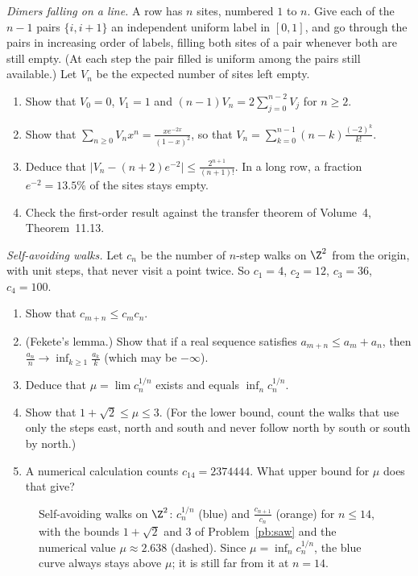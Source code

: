 \begin{exercise}[$\star\star$]\label{pb:flory}
\emph{Dimers falling on a line.} A row has $n$ sites, numbered $1$ to $n$. Give each of the $n-1$ pairs $\{i,i+1\}$ an independent uniform label in $[0,1]$, and go
through the pairs in increasing order of labels, filling both sites of a pair whenever both are still empty. (At each step the pair filled is
uniform among the pairs still available.) Let $V_n$ be the expected number of sites left empty.
\begin{enumerate}[label=(\alph*)]
\item Show that $V_0=0$, $V_1=1$ and $(n-1)V_n=2\sum_{j=0}^{n-2}V_j$ for $n\ge2$.
\item Show that $\sum_{n\ge0}V_nx^n=\frac{xe^{-2x}}{(1-x)^2}$, so that $V_n=\sum_{k=0}^{n-1}(n-k)\frac{(-2)^k}{k!}$.
\item Deduce that $\bigl|V_n-(n+2)e^{-2}\bigr|\le\frac{2^{n+1}}{(n+1)!}$. In a long row, a fraction $e^{-2}=13.5\%$ of the sites stays empty.
\item Check the first-order result against the transfer theorem of Volume~4, Theorem~11.13.
\end{enumerate}
\end{exercise}

\begin{exercise}[$\star\star$]\label{pb:saw}
\emph{Self-avoiding walks.} Let $c_n$ be the number of $n$-step walks on $\Z^2$ from the origin, with unit steps, that never visit a point twice. So $c_1=4$, $c_2=12$, $c_3=36$, $c_4=100$.
\begin{enumerate}[label=(\alph*)]
\item Show that $c_{m+n}\le c_mc_n$.
\item (Fekete's lemma.) Show that if a real sequence satisfies $a_{m+n}\le a_m+a_n$, then $\frac{a_n}n\to\inf_{k\ge1}\frac{a_k}k$ (which may be $-\infty$).
\item Deduce that $\mu=\lim c_n^{1/n}$ exists and equals $\inf_nc_n^{1/n}$.
\item Show that $1+\sqrt2\le\mu\le3$. (For the lower bound, count the walks that use only the steps east, north and south and never follow north by south or south by north.)
\item A numerical calculation counts $c_{14}=2374444$. What upper bound for $\mu$ does that give?
\end{enumerate}
\end{exercise}

\begin{figure}[ht]
\centering
{}
\caption{Self-avoiding walks on $\Z^2$: $c_n^{1/n}$ (blue) and $\frac{c_{n+1}}{c_n}$ (orange) for $n\le14$, with the bounds $1+\sqrt2$ and $3$ of Problem~\ref{pb:saw} and the
numerical value $\mu\approx2.638$ (dashed). Since $\mu=\inf_nc_n^{1/n}$, the blue curve always stays above $\mu$; it is still far from it at $n=14$.}
\label{fig:saw}
\end{figure}

